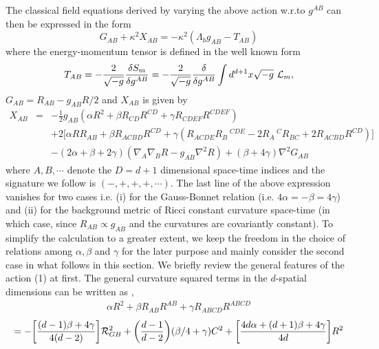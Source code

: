 \documentclass[a4paper,12pt]{article}
\newcommand {\nn} {\nonumber}
\begin{document}
The classical field equations derived by varying the above action w.r.to 
$g^{AB}$ can then be expressed in the form 
\begin{equation}
G_{AB}+\kappa^2 X_{AB}=-\kappa^2(\Lambda_b g_{AB}-T_{AB})
\end{equation}
where the energy-momentum tensor is defined in the well known form
\begin{equation}
T_{AB}=-\frac{2}{\sqrt{-g}}\frac{\delta S_m}{\delta g^{AB}}
=-\frac{2}{\sqrt{-g}}\frac{\delta}{\delta g^{AB}}\int d^{d+1}x 
\sqrt{-g}~{\cal L}_m,
\end{equation}
$G_{AB}=R_{AB}-g_{AB}R/2$ and $X_{AB}$ is given by
\begin{eqnarray}
X_{AB} &=&-\frac{1}{2}g_{AB} (\alpha R^2+\beta R_{CD}R^{CD}+
\gamma R_{CDEF}R^{CDEF})\nn\\
& &+2\big[ \alpha R R_{AB}+\beta R_{ACBD}R^{CD} +
 \gamma (R_{ACDE}R_B\,^{CDE}-2R_A\,^C R_{BC}+2R_{ACBD}R^{CD})\big]\nn\\
& &-(2\alpha+\beta+2\gamma)(\nabla_A\nabla_B R - g_{AB}\nabla^2R)+
(\beta+4\gamma)\nabla^2G_{AB}
\end{eqnarray}
where $A,B,\cdots$ denote the $D=d+1$ dimensional space-time indices and 
the signature we follow is $(-,+,+,+,\cdots)$.  
The last line of the above expression vanishes for two cases i.e. 
(i) for  the Gauss-Bonnet relation (i.e. $4\alpha=-\beta=4\gamma$) and 
(ii) for the background metric of Ricci constant curvature space-time 
(in which case, since $R_{AB}\propto g_{AB}$ and the curvatures are
 covariantly constant). To simplify the calculation to a greater extent, 
we keep the freedom in the choice of relations among $\alpha,\beta$ 
and $\gamma$ for the later purpose and  mainly consider the second case in 
what follows in this section.
We briefly review the general features of the action (1) at first. The 
general curvature squared terms in the $d$-spatial dimensions can be 
written as \cite{ILS},
\begin{eqnarray}
\alpha R^2+\beta R_{AB}R^{AB}+\gamma R_{ABCD}R^{ABCD}\nn
\end{eqnarray}
\begin{equation} 
=-\bigg[\frac{(d-1)\beta+4\gamma}{4(d-2)}\bigg]{\cal R}_{GB}^2
+\bigg(\frac{d-1}{d-2}\bigg)(\beta /4+\gamma)C^2
+\bigg[\frac{4d\alpha+(d+1)\beta+4\gamma}{4d}\bigg]R^2  
\end{equation}
\end{document}
